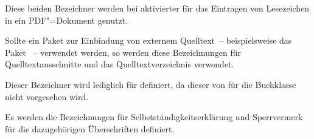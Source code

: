 \begin{Declaration}{}
\begin{Declaration}{}
\printdeclarationlist%
%
Diese beiden Bezeichner werden bei aktivierter  für das 
Eintragen von Lesezeichen in ein PDF"=Dokument genutzt.
\end{Declaration}
\end{Declaration}

\begin{Declaration}{}
\begin{Declaration}{}
\printdeclarationlist%
%
Sollte ein Paket zur Einbindung von externem Quelltext~-- beispielsweise 
das Paket ~-- verwendet werden, so werden diese Bezeichnungen 
für Quelltextausschnitte und das Quelltextverzeichnis verwendet.
\end{Declaration}
\end{Declaration}

\begin{Declaration}{}
\printdeclarationlist%
%
Dieser Bezeichner wird lediglich für  definiert, da dieser 
von \KOMAScript{} für die Buchklasse nicht vorgesehen wird.
\end{Declaration}

\begin{Declaration}{}
\begin{Declaration}{}
\printdeclarationlist%
%
%
Es werden die Bezeichnungen für Selbstständigkeitserklärung und Sperrvermerk 
für die dazugehörigen Überschriften definiert.
\end{Declaration}
\end{Declaration}

